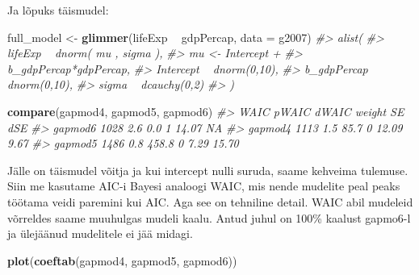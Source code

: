 \documentclass[]{book}
\newenvironment{Shaded}{\begin{snugshade}}{\end{snugshade}}
\newcommand{\KeywordTok}[1]{\textcolor[rgb]{0.13,0.29,0.53}{\textbf{#1}}}
\newcommand{\DataTypeTok}[1]{\textcolor[rgb]{0.13,0.29,0.53}{#1}}
\newcommand{\StringTok}[1]{\textcolor[rgb]{0.31,0.60,0.02}{#1}}
\newcommand{\CommentTok}[1]{\textcolor[rgb]{0.56,0.35,0.01}{\textit{#1}}}
\newcommand{\OperatorTok}[1]{\textcolor[rgb]{0.81,0.36,0.00}{\textbf{#1}}}
\newcommand{\NormalTok}[1]{#1}
\begin{document}
Ja lõpuks täismudel:

\begin{Shaded}
\begin{Highlighting}[]
\NormalTok{full_model <-}\StringTok{ }\KeywordTok{glimmer}\NormalTok{(lifeExp }\OperatorTok{~}\StringTok{ }\NormalTok{gdpPercap, }\DataTypeTok{data =}\NormalTok{ g2007)}
\CommentTok{#> alist(}
\CommentTok{#>     lifeExp ~ dnorm( mu , sigma ),}
\CommentTok{#>     mu <- Intercept +}
\CommentTok{#>         b_gdpPercap*gdpPercap,}
\CommentTok{#>     Intercept ~ dnorm(0,10),}
\CommentTok{#>     b_gdpPercap ~ dnorm(0,10),}
\CommentTok{#>     sigma ~ dcauchy(0,2)}
\CommentTok{#> )}
\end{Highlighting}
\end{Shaded}

\begin{Shaded}
\end{Shaded}

\begin{Shaded}
\begin{Highlighting}[]
\KeywordTok{compare}\NormalTok{(gapmod4, gapmod5, gapmod6)}
\CommentTok{#>         WAIC pWAIC dWAIC weight    SE   dSE}
\CommentTok{#> gapmod6 1028   2.6   0.0      1 14.07    NA}
\CommentTok{#> gapmod4 1113   1.5  85.7      0 12.09  9.67}
\CommentTok{#> gapmod5 1486   0.8 458.8      0  7.29 15.70}
\end{Highlighting}
\end{Shaded}

Jälle on täismudel võitja ja kui intercept nulli suruda, saame kehveima
tulemuse. Siin me kasutame AIC-i Bayesi analoogi WAIC, mis nende
mudelite peal peaks töötama veidi paremini kui AIC. Aga see on tehniline
detail. WAIC abil mudeleid võrreldes saame muuhulgas mudeli kaalu. Antud
juhul on 100\% kaalust gapmo6-l ja ülejäänud mudelitele ei jää midagi.

\begin{Shaded}
\begin{Highlighting}[]
\KeywordTok{plot}\NormalTok{(}\KeywordTok{coeftab}\NormalTok{(gapmod4, gapmod5, gapmod6))}
\end{Highlighting}
\end{Shaded}
\end{document}
